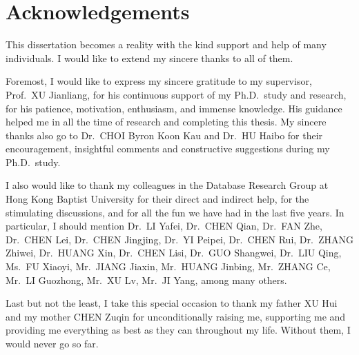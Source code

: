 \chapter{Acknowledgements}

This dissertation becomes a reality with the kind support and help of many individuals. I would like to extend my sincere thanks to all of them.

Foremost, I would like to express my sincere gratitude to my supervisor, Prof.~XU Jianliang, for his continuous support of my Ph.D.\ study and research, for his patience, motivation, enthusiasm, and immense knowledge. His guidance helped me in all the time of research and completing this thesis. My sincere thanks also go to Dr.~CHOI Byron Koon Kau and Dr.~HU Haibo for their encouragement, insightful comments and constructive suggestions during my Ph.D.\ study.

I also would like to thank my colleagues in the Database Research Group at Hong Kong Baptist University for their direct and indirect help, for the stimulating discussions, and for all the fun we have had in the last five years. In particular, I should mention Dr.~LI Yafei, Dr.~CHEN Qian, Dr.~FAN Zhe, Dr.~CHEN Lei, Dr.~CHEN Jingjing, Dr.~YI Peipei, Dr.~CHEN Rui, Dr.~ZHANG Zhiwei, Dr.~HUANG Xin, Dr.~CHEN Lisi, Dr.~GUO Shangwei, Dr.~LIU Qing, Ms.~FU Xiaoyi, Mr.~JIANG Jiaxin, Mr.~HUANG Jinbing, Mr.~ZHANG Ce, Mr.~LI Guozhong, Mr.~XU Lv, Mr.~JI Yang, among many others.

Last but not the least, I take this special occasion to thank my father XU Hui and my mother CHEN Zuqin for unconditionally raising me, supporting me and providing me everything as best as they can throughout my life. Without them, I would never go so far.
